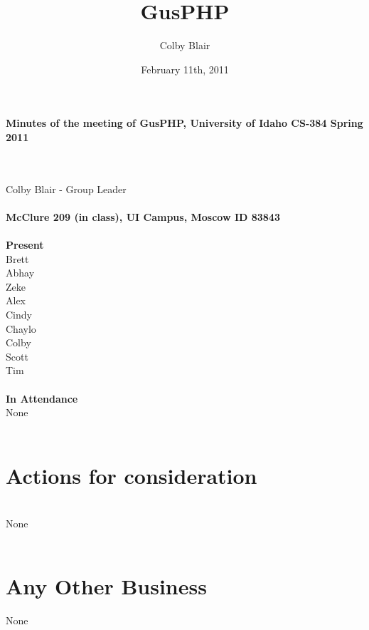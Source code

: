 \documentclass[12pt]{article}
\title{GusPHP}
\date{February 11th, 2011}
\author{Colby Blair}
\begin{document}
\maketitle
\begin{center}\textbf{Minutes of the meeting of GusPHP, University of Idaho CS-384 Spring 2011} \end{center} \\ \\
	Colby Blair - Group Leader\\ \\
\textbf{McClure 209 (in class), UI Campus, Moscow ID 83843} \\ \\
\textbf{Present}\\ 
Brett\\
Abhay\\
Zeke\\
Alex\\
Cindy\\
Chaylo\\
Colby\\
Scott\\
Tim\\
\\
\textbf{In Attendance}\\
None \\
\\
\section{Actions for consideration} \\
None \\
\\
\section{Any Other Business}
None \\
\\
\end{document}
